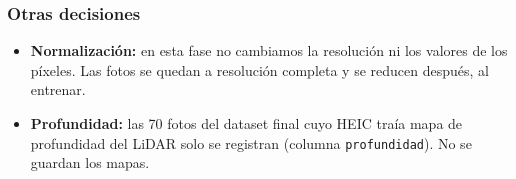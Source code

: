 \subsubsection*{Otras decisiones}

\begin{itemize}
  \item \textbf{Normalización:} en esta fase no cambiamos la resolución ni los valores de los píxeles. Las fotos se quedan a resolución completa y se reducen después, al entrenar.
  \item \textbf{Profundidad:} las 70 fotos del dataset final cuyo HEIC traía mapa de profundidad del LiDAR solo se registran (columna \texttt{profundidad}). No se guardan los mapas.
\end{itemize}
